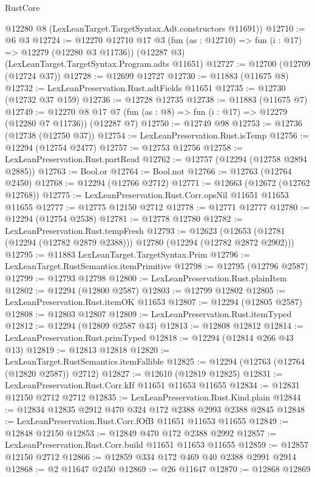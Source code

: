 \begin{lexlean}{RustCore}
\begin{coremodule}
    @12280 @8 (LexLeanTarget.TargetSyntax.Adt.constructors @11691))
@12710 := @6 @3
@12724 := @12270
    @12710
    @17
    @3
    (fun (as : @12710) => fun (i : @17) => @12279 (@12280 @3 @11736))
    (@12287 @3)
    (LexLeanTarget.TargetSyntax.Program.adts @11651)
@12727 := @12700 (@12709 (@12724 @37))
@12728 := @12699 @12727
@12730 := @11883 (@11675 @8)
@12732 := LexLeanPreservation.Rust.adtFields @11651
@12735 := @12730 (@12732 @37 @159)
@12736 := @12728 @12735
@12738 := @11883 (@11675 @7)
@12749 := @12270 @8 @17 @7 (fun (as : @8) => fun (i : @17) => @12279 (@12280 @7 @11736)) (@12287 @7)
@12750 := @12749 @98
@12753 := @12736 (@12738 (@12750 @37))
@12754 := LexLeanPreservation.Rust.isTemp
@12756 := @12294 (@12754 @2477)
@12757 := @12753 @12756
@12758 := LexLeanPreservation.Rust.partRead
@12762 := @12757 (@12294 (@12758 @2894 @2885))
@12763 := Bool.or
@12764 := Bool.not
@12766 := @12763 (@12764 @2450)
@12768 := @12294 (@12766 @2712)
@12771 := @12663 (@12672 (@12762 @12768))
@12775 := LexLeanPreservation.Rust.Corr.opsNil @11651 @11653 @11655
@12777 := @12775 @12150 @2712
@12778 := @12771 @12777
@12780 := @12294 (@12754 @2538)
@12781 := @12778 @12780
@12782 := LexLeanPreservation.Rust.tempFresh
@12793 := @12623
    (@12653 (@12781 (@12294 (@12782 @2879 @2388))) @12780 (@12294 (@12782 @2872 @2902)))
@12795 := @11883 LexLeanTarget.TargetSyntax.Prim
@12796 := LexLeanTarget.RustSemantics.itemPrimitive
@12798 := @12795 (@12796 @2587)
@12799 := @12793 @12798
@12800 := LexLeanPreservation.Rust.plainItem
@12802 := @12294 (@12800 @2587)
@12803 := @12799 @12802
@12805 := LexLeanPreservation.Rust.itemOK @11653
@12807 := @12294 (@12805 @2587)
@12808 := @12803 @12807
@12809 := LexLeanPreservation.Rust.itemTyped
@12812 := @12294 (@12809 @2587 @43)
@12813 := @12808 @12812
@12814 := LexLeanPreservation.Rust.primTyped
@12818 := @12294 (@12814 @266 @43 @13)
@12819 := @12813 @12818
@12820 := LexLeanTarget.RustSemantics.itemFallible
@12825 := @12294 (@12763 (@12764 (@12820 @2587)) @2712)
@12827 := @12610 (@12819 @12825)
@12831 := LexLeanPreservation.Rust.Corr.kIf @11651 @11653 @11655
@12834 := @12831 @12150 @2712 @2712
@12835 := LexLeanPreservation.Rust.Kind.plain
@12844 := @12834 @12835 @2912 @470 @324 @172 @2388 @2993 @2388 @2845
@12848 := LexLeanPreservation.Rust.Corr.fOfB @11651 @11653 @11655
@12849 := @12848 @12150
@12853 := @12849 @470 @172 @2388 @2992
@12857 := LexLeanPreservation.Rust.Corr.build @11651 @11653 @11655
@12859 := @12857 @12150 @2712
@12866 := @12859 @334 @172 @469 @40 @2388 @2991 @2914
@12868 := @2 @11647 @2450
@12869 := @26 @11647
@12870 := @12868 @12869

\end{coremodule}
\end{lexlean}
